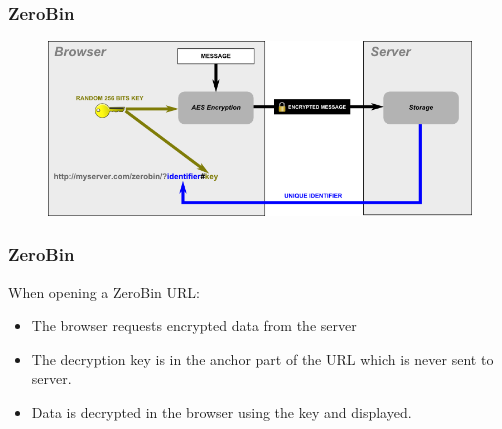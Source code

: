 \begin{frame}
\frametitle{ZeroBin}
\begin{figure}
\includegraphics[width=0.8\linewidth]{./materials/zerobin_figure_encryption.png}
\end{figure}
\end{frame}

\begin{frame}
\frametitle{ZeroBin}
When opening a ZeroBin URL:
\begin{itemize}
\item The browser requests encrypted data from the server
\item The decryption key is in the anchor part of the URL which is never sent to server.
\item Data is decrypted in the browser using the key and displayed.
\end{itemize}
\end{frame}


